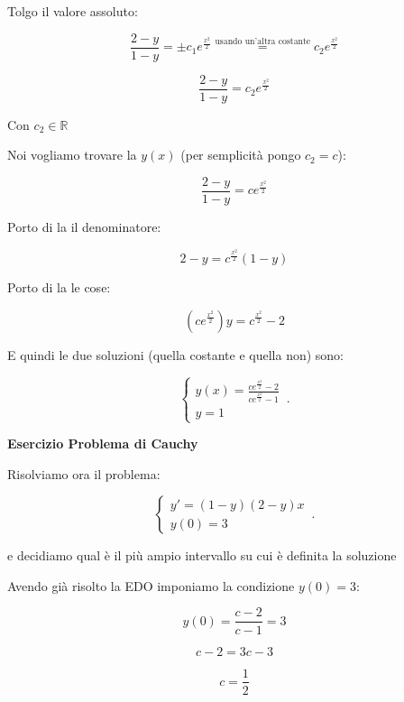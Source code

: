 \documentclass[11pt]{article}
\begin{document}
\begin{enumerate}
        Tolgo il valore assoluto:

        \[
            \frac{2-y}{1-y} = \pm c_1 e ^{\frac{x ^{2}}{2} }\overset{\text{usando un'altra costante}}{=}c_2 e ^{\frac{x ^{2}}{2} }
        \]

        \[
            \frac{2-y}{1-y} = c_2 e ^{\frac{x ^{2}}{2} }
        \]

        Con $c_2 \in \mathbb{R}$

        Noi vogliamo trovare la $y(x)$ (per semplicità pongo $c_2 = c$):

        \[
            \frac{2-y}{1-y} = c e ^{\frac{x ^{2}}{2} }
        \]

        Porto di la il denominatore:

        \[
            2-y = c ^{\frac{x ^{2}}{2} } (1-y)
        \]

        Porto di la le cose:

        \[
            (c e ^{\frac{x ^{2}}{2} })y = c ^{\frac{x ^{2}}{2} }-2
        \]

        E quindi le due soluzioni (quella costante e quella non) sono:

        \begin{equation}
            \begin{cases}
            y(x) = \frac{c e ^{\frac{x ^{2}}{2} }-2}{c e ^{\frac{x ^{2}}{2} }-1}   \\
            y=1
            \end{cases}\,.
        \end{equation}

\end{enumerate}

\textbf{Esercizio Problema di Cauchy}

Risolviamo ora il problema:

\begin{equation}
    \begin{cases}
      y'=(1-y)(2-y)x\\
      y(0)=3
    \end{cases}\,.
\end{equation}

e decidiamo qual è il più ampio intervallo su cui è definita la soluzione

Avendo già risolto la EDO imponiamo la condizione $y(0) = 3$:

\[
    y(0) = \frac{c-2}{c-1} = 3
\]

\[
    c-2 = 3c -3
\]

\[
    c = \frac{1}{2} 
\]
\end{document}
